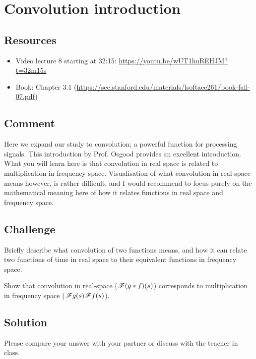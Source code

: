 \newpage
\section{Convolution introduction}

\subsection*{Resources}
\begin{itemize}
    \item Video lecture 8 starting at 32:15: \url{https://youtu.be/wUT1huREHJM?t=32m15s}
    \item Book: Chapter 3.1 (\url{https://see.stanford.edu/materials/lsoftaee261/book-fall-07.pdf})
\end{itemize}

\subsection*{Comment}
Here we expand our study to convolution; a powerful function for processing signals.
This introduction by Prof. Osgood provides an excellent introduction.
What you will learn here is that convolution in real space is related to multiplication in frequency space.
Visualisation of what convolution in real-space means however, is rather difficult, and I would recommend to focus purely on the mathematical meaning here of how it relates functions in real space and frequency space.

\subsection*{Challenge}
Briefly describe what convolution of two functions means, and how it can relate two functions of time in real space to their equivalent functions in frequency space.

Show that convolution in real-space ($\mathscr{F}(g*f)(s)$) corresponds to multiplication in frequency space ($\mathscr{F} g(s) \mathscr{F} f(s)$).

\subsection*{Solution}
Please compare your answer with your partner or discuss with the teacher in class.




\newpage
